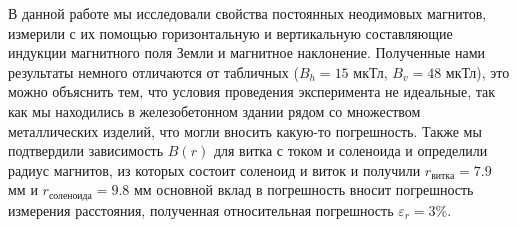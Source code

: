 \documentclass[a4paper, 12pt]{article}%
\begin{document}
	В данной работе мы исследовали свойства постоянных неодимовых магнитов,
	измерили с их помощью горизонтальную и вертикальную составляющие
	индукции магнитного поля Земли и магнитное наклонение. Полученные нами результаты немного отличаются от табличных ($B_h = 15$ мкТл, $B_v = 48$ мкТл), это можно объяснить тем, что условия проведения эксперимента не идеальные, так как мы находились в железобетонном здании рядом со множеством металлических изделий, что могли вносить какую-то погрешность. Также мы подтвердили зависимость $B(r)$ для витка с током и соленоида и определили радиус магнитов, из которых состоит соленоид и виток и получили $r_{\text{витка}} = 7.9$ мм и $r_{\text{соленоида}} = 9.8$ мм основной вклад в погрешность вносит погрешность измерения расстояния, полученная относительная погрешность $\varepsilon_r = 3\%$.
	
	
	
	
	
	
	
	
	
\end{document}
